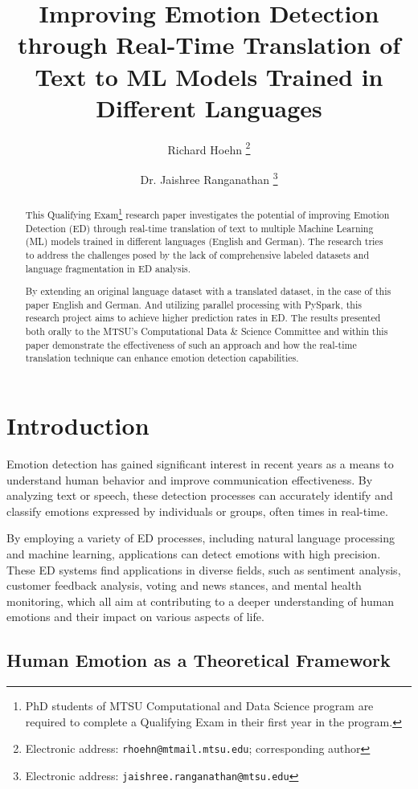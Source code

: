 \documentclass[11pt]{article}
\title{Improving Emotion Detection through Real-Time Translation of Text to ML Models Trained in Different Languages}
\author{Richard Hoehn%
	\thanks{Electronic address: \texttt{rhoehn@mtmail.mtsu.edu}; corresponding author}}
\affil{Middle Tennessee State University}
\author{Dr. Jaishree Ranganathan%
	\thanks{Electronic address: \texttt{jaishree.ranganathan@mtsu.edu}}}
\affil{Middle Tennessee State University}
\begin{document}
\maketitle

\begin{abstract}
This Qualifying Exam\footnote{PhD students of MTSU Computational and Data  Science program are required to complete a Qualifying Exam in their first year in the program.} research paper investigates the potential of improving Emotion Detection (ED) through real-time translation of text to multiple Machine Learning (ML) models trained in different languages (English and German). The research tries to address the challenges posed by the lack of comprehensive labeled datasets and language fragmentation in ED analysis. 

By extending an original language dataset with a translated dataset, in the case of this paper English and German. And utilizing parallel processing with PySpark, this research project aims to achieve higher prediction rates in ED. The results presented both orally to the MTSU's Computational Data \& Science Committee and within this paper demonstrate the effectiveness of such an approach and how the real-time translation technique can enhance emotion detection capabilities.
\end{abstract}
\clearpage

\tableofcontents

\clearpage
\section{Introduction}

Emotion detection has gained significant interest in recent years as a means to understand human behavior and improve communication effectiveness. By analyzing text or speech, these detection processes can accurately identify and classify emotions expressed by individuals or groups, often times in real-time.

By employing a variety of ED processes, including natural language processing and machine learning, applications can detect emotions with high precision. These ED systems find applications in diverse fields, such as sentiment analysis, customer feedback analysis, voting and news stances, and mental health monitoring, which all aim at contributing to a deeper understanding of human emotions and their impact on various aspects of life.

\subsection{Human Emotion as a Theoretical Framework}
\end{document}
